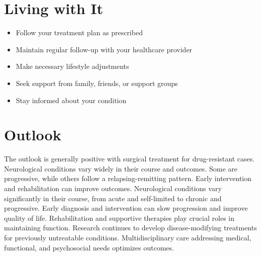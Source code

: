 \section{Living with It}
\begin{itemize}[noitemsep]
  \item Follow your treatment plan as prescribed
  \item Maintain regular follow-up with your healthcare provider
  \item Make necessary lifestyle adjustments
  \item Seek support from family, friends, or support groups
  \item Stay informed about your condition
\end{itemize}
\section{Outlook}
The outlook is generally positive with surgical treatment for drug-resistant cases. Neurological conditions vary widely in their course and outcomes. Some are progressive, while others follow a relapsing-remitting pattern. Early intervention and rehabilitation can improve outcomes. Neurological conditions vary significantly in their course, from acute and self-limited to chronic and progressive. Early diagnosis and intervention can slow progression and improve quality of life. Rehabilitation and supportive therapies play crucial roles in maintaining function. Research continues to develop disease-modifying treatments for previously untreatable conditions. Multidisciplinary care addressing medical, functional, and psychosocial needs optimizes outcomes.
